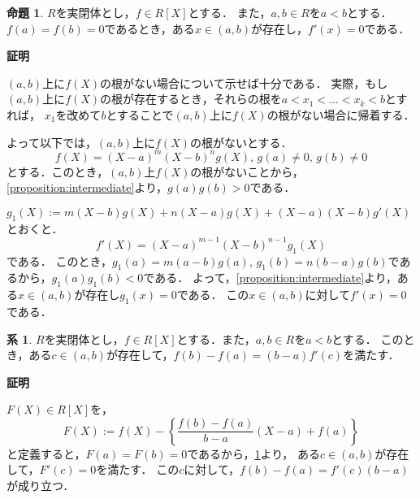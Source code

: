 \documentclass[uplatex, dvipdfmx]{jsarticle}
\makeatletter
\numberwithin{equation}{section}
\renewenvironment{proof}[1][\proofname]{\par
  \pushQED{\qed}%
  \normalfont \topsep6\p@\@plus6\p@\relax
  \trivlist
  \item\relax
  {\bfseries
  #1\@addpunct{.}}\hspace\labelsep\ignorespaces
}{
  \popQED\endtrivlist\@endpefalse
}
\theoremstyle{definition}
\newtheorem{proposition}[definition]{命題}
\newtheorem{corollary}[definition]{系}
\renewcommand{\proofname}{\textbf{証明}}
\makeatother
\begin{document}
\begin{proposition}\label{proposition:Rolle}
     $R$を実閉体とし，$f \in R[X]$とする．
     また，$a, b \in R$を$a<b$とする．
     $f(a)=f(b)=0$であるとき，ある$x \in (a,b)$が存在し，$f'(x)=0$である．
\end{proposition}
\begin{proof}
     $(a,b)$上に$f(X)$の根がない場合について示せば十分である．
     実際，もし$(a,b)$上に$f(X)$の根が存在するとき，それらの根を$a < x_1 < \dots < x_k < b$とすれば，
     $x_1$を改めて$b$とすることで$(a,b)$上に$f(X)$の根がない場合に帰着する．

     よって以下では，$(a,b)$上に$f(X)$の根がないとする．
     \begin{equation}
     f(X) = (X-a)^m(X-b)^ng(X), \, g(a)\neq0,\, g(b)\neq0
     \end{equation}
     とする．このとき，$(a,b)$上$f(X)$の根がないことから，\cref{proposition:intermediate}より，$g(a)g(b)>0$である．
     
     $g_1(X) := m(X-b)g(X)+n(X-a)g(X)+(X-a)(X-b)g'(X)$とおくと．
     \begin{equation}
          f'(X) = (X-a)^{m-1}(X-b)^{n-1}g_1(X)
     \end{equation}
     である．
     このとき，$g_1(a) = m(a-b)g(a)$, $g_1(b)=n(b-a)g(b)$であるから，$g_1(a)g_1(b)<0$である．
     よって，\cref{proposition:intermediate}より，ある$x \in (a, b)$が存在し$g_1(x)=0$である．
     この$x \in (a,b)$に対して$f'(x)=0$である．
\end{proof}

\begin{corollary}\label{corollary:mean-value}
     $R$を実閉体とし，$f \in R[X]$とする．また，$a, b \in R$を$a<b$とする．
     このとき，ある$c \in (a,b)$が存在して，$f(b)-f(a) = (b-a)f'(c)$を満たす．
\end{corollary}

\begin{proof}
     $F(X) \in R[X]$を，
     \begin{equation}
          F(X) := f(X) - \left\{\frac{f(b)-f(a)}{b-a}(X-a) + f(a)\right\}
     \end{equation}
     と定義すると，$F(a)=F(b)=0$であるから，\cref{proposition:Rolle}より，
     ある$c \in (a,b)$が存在して，$F'(c)=0$を満たす．
     この$c$に対して，$f(b)-f(a)=f'(c)(b-a)$が成り立つ．
\end{proof}
\end{document}
